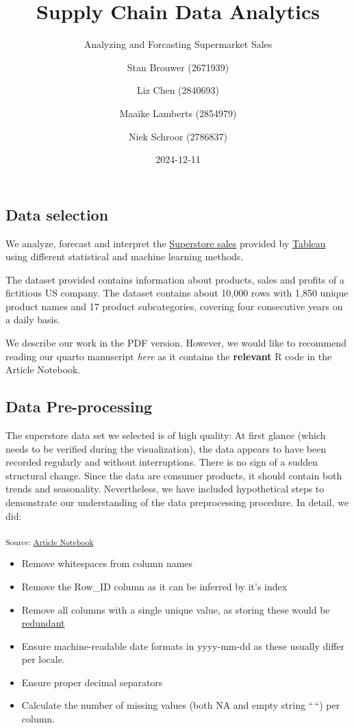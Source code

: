 \documentclass[
  letterpaper,
  DIV=11,
  numbers=noendperiod]{scrartcl}
\title{Supply Chain Data Analytics}
\subtitle{Analyzing and Forcasting Supermarket Sales}
\author{Stan Brouwer (2671939) \and Liz Chen (2840693) \and Maaike
Lamberts (2854979) \and Niek Schroor (2786837)}
\date{2024-12-11}
\providecommand{\tightlist}{%
  \setlength{\itemsep}{0pt}\setlength{\parskip}{0pt}}\usepackage{longtable,booktabs,array}
\begin{document}
\maketitle


\subsection{Data selection}\label{data-selection}

We analyze, forecast and interpret the
\href{https://public.tableau.com/app/sample-data/sample_-_superstore.xls}{Superstore
sales} provided by
\href{https://public.tableau.com/app/learn/sample-data}{Tableau} using
different statistical and machine learning methods.

The dataset provided contains information about products, sales and
profits of a fictitious US company. The dataset contains about 10,000
rows with 1,850 unique product names and 17 product subcategories,
covering four consecutive years on a daily basis.

We describe our work in the PDF version. However, we would like to
recommend reading our quarto manuscript \emph{here} as it contains the
\textbf{relevant} R code in the Article Notebook.

\subsection{Data Pre-processing}\label{data-pre-processing}

The superstore data set we selected is of high quality: At first glance
(which needs to be verified during the visualization), the data appears
to have been recorded regularly and without interruptions. There is no
sign of a sudden structural change. Since the data are consumer
products, it should contain both trends and seasonality. Nevertheless,
we have included hypothetical steps to demonstrate our understanding of
the data preprocessing procedure. In detail, we did:

\textsubscript{Source:
\href{https://SJbrou.github.io/Supply_Chain_Data_Analysis/index.qmd.html}{Article
Notebook}}

\begin{itemize}
\tightlist
\item
  Remove whitespaces from column names
\item
  Remove the Row\_ID column as it can be inferred by it's index
\item
  Remove all columns with a single unique value, as storing these would
  be
  \href{https://few.vu.nl/~molenaar/courses/StatR/chapters/B-06-raw_data.html}{redundant}
\item
  Ensure machine-readable date formats in yyyy-mm-dd as these usually
  differ per locale.
\item
  Ensure proper decimal separators
\item
  Calculate the number of missing values (both NA and empty string
  ``\,``) per column.
\end{itemize}
\end{document}
